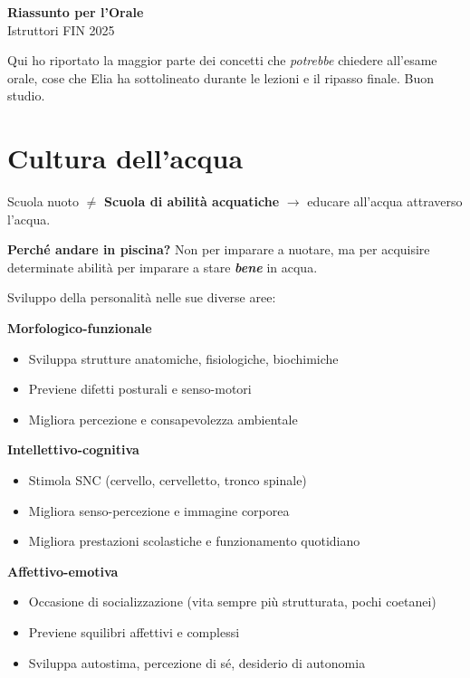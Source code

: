 \documentclass[12pt, a4paper]{article}
\begin{document}
\begin{center}
{\LARGE\bfseries\color{primary} Riassunto per l'Orale}\\[0.4em]
{\large\color{primary!80} Istruttori FIN 2025}
\end{center}

\vspace{0.8em}

\begin{quotebox}
Qui ho riportato la maggior parte dei concetti che \textit{potrebbe} chiedere all'esame orale, cose che Elia ha sottolineato durante le lezioni e il ripasso finale.
Buon studio.
\end{quotebox}

\vspace{1em}
\tableofcontents
\newpage

\section{Cultura dell'acqua}

Scuola nuoto $\neq$ \textbf{Scuola di abilità acquatiche} $\rightarrow$ educare all'acqua attraverso l'acqua.

\textbf{Perché andare in piscina?} Non per imparare a nuotare, ma per acquisire determinate abilità per imparare a stare \textbf{\textit{bene}} in acqua.

\medskip
Sviluppo della personalità nelle sue diverse aree:

\medskip\noindent\textbf{Morfologico-funzionale}
\begin{itemize}
  \item Sviluppa strutture anatomiche, fisiologiche, biochimiche
  \item Previene difetti posturali e senso-motori
  \item Migliora percezione e consapevolezza ambientale
\end{itemize}

\noindent\textbf{Intellettivo-cognitiva}
\begin{itemize}
  \item Stimola SNC (cervello, cervelletto, tronco spinale)
  \item Migliora senso-percezione e immagine corporea
  \item Migliora prestazioni scolastiche e funzionamento quotidiano
\end{itemize}

\noindent\textbf{Affettivo-emotiva}
\begin{itemize}
  \item Occasione di socializzazione (vita sempre più strutturata, pochi coetanei)
  \item Previene squilibri affettivi e complessi
  \item Sviluppa autostima, percezione di sé, desiderio di autonomia
\end{itemize}
\end{document}
